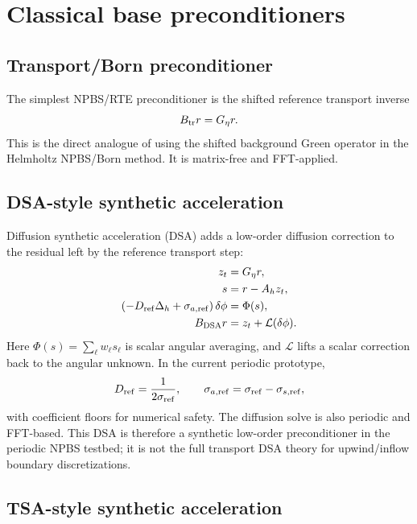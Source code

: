 \documentclass[11pt]{article}
\newcommand{\Ah}{A_h}
\newcommand{\Geta}{G_\eta}
\begin{document}
\section{Classical base preconditioners}

\subsection{Transport/Born preconditioner}

The simplest NPBS/RTE preconditioner is the shifted reference transport inverse
\begin{equation}
  B_{\rm tr}r=\Geta r.
\end{equation}
This is the direct analogue of using the shifted background Green operator in
the Helmholtz NPBS/Born method.  It is matrix-free and FFT-applied.

\subsection{DSA-style synthetic acceleration}

Diffusion synthetic acceleration (DSA) adds a low-order diffusion correction to
the residual left by the reference transport step:
\begin{align}
  z_t &= \Geta r,\\
  s &= r-\Ah z_t,\\
  \left(-D_{\rm ref}\Delta_h+\sigma_{a,\rm ref}\right)\delta\phi
    &= \Phi(s),\\
  B_{\rm DSA}r &= z_t+\mathcal{L}(\delta\phi).
\end{align}
Here \(\Phi(s)=\sum_\ell w_\ell s_\ell\) is scalar angular averaging, and
\(\mathcal{L}\) lifts a scalar correction back to the angular unknown.  In the
current periodic prototype,
\[
  D_{\rm ref}=\frac{1}{2\sigma_{\rm ref}},
  \qquad
  \sigma_{a,\rm ref}=\sigma_{\rm ref}-\sigma_{s,\rm ref},
\]
with coefficient floors for numerical safety.  The diffusion solve is also
periodic and FFT-based.  This DSA is therefore a synthetic low-order
preconditioner in the periodic NPBS testbed; it is not the full transport DSA
theory for upwind/inflow boundary discretizations.

\subsection{TSA-style synthetic acceleration}
\end{document}
